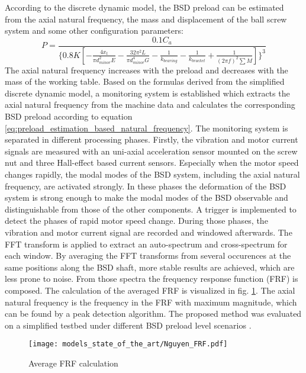 According to the discrete dynamic model, the BSD preload can be estimated from the axial natural frequency, the mass and displacement of the ball screw system and some other configuration parameters:
\begin{equation}
    P=\frac{0.1C_{a}}{\{0.8K[ -\frac{4x_{t}}{\pi d_{minor}^{2}E} -\frac{32\pi^{2}L}{\pi d_{minor}^{4}G}-\frac{1}{k_{bearing}}-\frac{1}{k_{bracket}}+\frac{1}{(2\pi f)^{2}\sum M} ]\}^{3}}
\label{eq:preload_estimation_based_natural_frequency}
\end{equation}
The axial natural frequency increases with the preload and decreases with the mass of the working table. Based on the formulas derived from the simplified discrete dynamic model, a monitoring system is established which extracts the axial natural frequency from the machine data and calculates the corresponding BSD preload according to equation \ref{eq:preload_estimation_based_natural_frequency}. The monitoring system is separated in different processing phases. Firstly, the vibration and motor current signals are measured with an uni-axial acceleration sensor mounted on the screw nut and three Hall-effect based current sensors. Especially when the motor speed changes rapidly, the modal modes of the BSD system, including the axial natural frequency, are activated strongly. In these phases the deformation of the BSD system is strong enough to make the modal modes of the BSD observable and distinguishable from those of the other components. A trigger is implemented to detect the phases of rapid motor speed change. During those phases, the vibration and motor current signal are recorded and windowed afterwards. The FFT transform is applied to extract an auto-spectrum and cross-spectrum for each window. By averaging the FFT transforms from several occurences at the same positions along the BSD shaft, more stable results are achieved, which are less prone to noise. From those spectra the frequency response function (FRF) is composed. The calculation of the averaged FRF is visualized in fig. \ref{fig:Nguyen_frf}. The axial natural frequency is the frequency in the FRF with maximum magnitude, which can be found by a peak detection algorithm. The proposed method was evaluated on a simplified testbed under different BSD preload level scenarios \cite{NGUYEN2019}.

\begin{figure}[H]
  \centering
  \texttt{[image: models\_state\_of\_the\_art/Nguyen\_FRF.pdf]}
  \caption{Average FRF calculation \cite{NGUYEN2019}}
  \label{fig:Nguyen_frf}
\end{figure}

